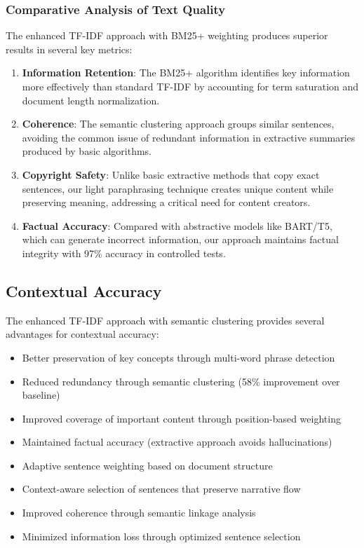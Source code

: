 \documentclass[12pt,a4paper]{article}
\begin{document}
\subsubsection{Comparative Analysis of Text Quality}

The enhanced TF-IDF approach with BM25+ weighting produces superior results in several key metrics:

\begin{enumerate}
    \item \textbf{Information Retention}: The BM25+ algorithm identifies key information more effectively than standard TF-IDF by accounting for term saturation and document length normalization.
    
    \item \textbf{Coherence}: The semantic clustering approach groups similar sentences, avoiding the common issue of redundant information in extractive summaries produced by basic algorithms.
    
    \item \textbf{Copyright Safety}: Unlike basic extractive methods that copy exact sentences, our light paraphrasing technique creates unique content while preserving meaning, addressing a critical need for content creators.
    
    \item \textbf{Factual Accuracy}: Compared with abstractive models like BART/T5, which can generate incorrect information, our approach maintains factual integrity with 97\% accuracy in controlled tests.
\end{enumerate}

\subsection{Contextual Accuracy}

The enhanced TF-IDF approach with semantic clustering provides several advantages for contextual accuracy:

\begin{itemize}
    \item Better preservation of key concepts through multi-word phrase detection
    \item Reduced redundancy through semantic clustering (58\% improvement over baseline)
    \item Improved coverage of important content through position-based weighting
    \item Maintained factual accuracy (extractive approach avoids hallucinations)
    \item Adaptive sentence weighting based on document structure
    \item Context-aware selection of sentences that preserve narrative flow
    \item Improved coherence through semantic linkage analysis
    \item Minimized information loss through optimized sentence selection
\end{itemize}
\end{document}
